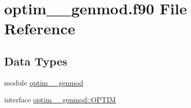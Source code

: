 \hypertarget{optim____genmod_8f90}{\section{optim\+\_\+\+\_\+genmod.\+f90 File Reference}
\label{optim____genmod_8f90}
}
\subsection*{Data Types}
\begin{DoxyCompactItemize}
\item 
module \hyperlink{classoptim____genmod}{optim\+\_\+\+\_\+genmod}
\item 
interface \hyperlink{interfaceoptim____genmod_1_1OPTIM}{optim\+\_\+\+\_\+genmod\+::\+O\+P\+T\+I\+M}
\end{DoxyCompactItemize}
